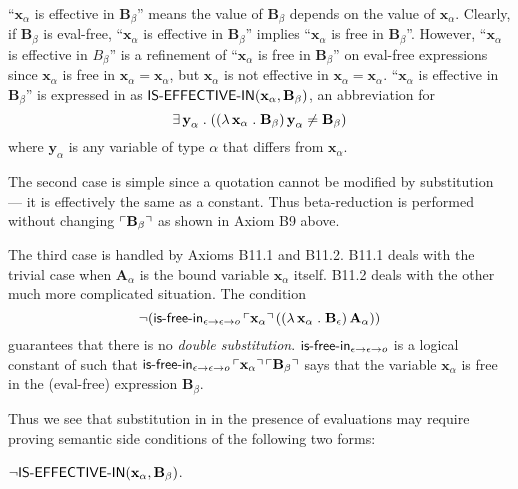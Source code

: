 \documentclass[fleqn]{llncs}
\begin{document}
``$\textbf{x}_\alpha$ is effective in $\textbf{B}_\beta$'' means the
value of $\textbf{B}_\beta$ depends on the value of
$\textbf{x}_\alpha$.  Clearly, if $\textbf{B}_\beta$ is eval-free,
``$\textbf{x}_\alpha$ is effective in $\textbf{B}_\beta$'' implies
``$\textbf{x}_\alpha$ is free in $\textbf{B}_\beta$''.  However,
``$\textbf{x}_\alpha$ is effective in ${B}_\beta$'' is a refinement of
``$\textbf{x}_\alpha$ is free in $\textbf{B}_\beta$'' on eval-free
expressions since $\textbf{x}_\alpha$ is free in $\textbf{x}_\alpha =
\textbf{x}_\alpha$, but $\textbf{x}_\alpha$ is not effective in
$\textbf{x}_\alpha = \textbf{x}_\alpha$.  ``$\textbf{x}_\alpha$ is
effective in $\textbf{B}_\beta$'' is expressed in {\churchqe} as
$\mbox{\sf IS-EFFECTIVE-IN}(\textbf{x}_\alpha,\textbf{B}_\beta)$, an
abbreviation for \[\exists\, \textbf{y}_\alpha \mathrel. ((\lambda\,
\textbf{x}_\alpha \mathrel. \textbf{B}_\beta) \, \textbf{y}_\alpha \not=
\textbf{B}_\beta)\] where $\textbf{y}_\alpha$ is any variable of type
$\alpha$ that differs from $\textbf{x}_\alpha$.

The second case is simple since a quotation cannot be modified by
substitution --- it is effectively the same as a constant. Thus
beta-reduction is performed without changing
$\ulcorner\textbf{B}_\beta\urcorner$ as shown in Axiom B9 above.

The third case is handled by Axioms B11.1 and B11.2.  B11.1 deals with
the trivial case when $\textbf{A}_\alpha$ is the bound variable
$\textbf{x}_\alpha$ itself.  B11.2 deals with the other much more
complicated situation.  The condition
\[\neg(\mbox{\sf is-free-in}_{\epsilon \rightarrow \epsilon \rightarrow o}
      \, \ulcorner\textbf{x}_\alpha\urcorner \, ((\lambda\,
      \textbf{x}_\alpha \mathrel. \textbf{B}_\epsilon) \,
      \textbf{A}_\alpha))\] guarantees that there is no
      \emph{double substitution}.  $\mbox{\sf is-free-in}_{\epsilon \rightarrow
        \epsilon \rightarrow o}$ is a logical constant of {\churchqe} such
      that $\mbox{\sf is-free-in}_{\epsilon \rightarrow \epsilon \rightarrow o}
      \, \ulcorner\textbf{x}_\alpha\urcorner \,
      \ulcorner\textbf{B}_\beta\urcorner$ says that the variable
      $\textbf{x}_\alpha$ is free in the (eval-free) expression
      $\textbf{B}_\beta$.

Thus we see that substitution in {\churchqe} in the presence of
evaluations may require proving semantic side conditions of the
following two forms:

\be

  \item $\neg
    \mbox{\sf IS-EFFECTIVE-IN}(\textbf{x}_\alpha,\textbf{B}_\beta)$.
\end{document}
